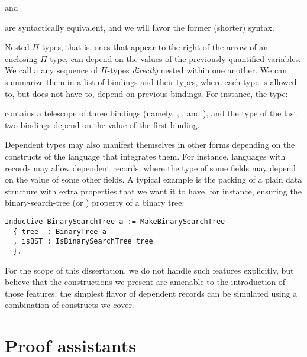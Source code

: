 \noindent
and

\noindent
{}

\noindent
are syntactically equivalent, and we will favor the former (shorter) syntax.


Nested $\Pi$-types, that is, ones that appear to the right of the arrow of an
enclosing $\Pi$-type, can depend on the values of the previously quantified
variables.  We call a  any sequence of $\Pi$-types
\emph{directly} nested within one another.  We can summarize them in a list of
bindings and their types, where each type is allowed to, but does not have to,
depend on previous bindings.  For instance, the type:

\noindent
{}

\noindent
contains a telescope of three bindings (namely, , ,
and ), and the type of the last two bindings depend on the value of
the first binding.

Dependent types may also manifest themselves in other forms depending on the
constructs of the language that integrates them.  For instance, languages with
records may allow dependent records, where the type of some fields may depend on
the value of some other fields.  A typical example is the packing of a plain
data structure with extra properties that we want it to have, for instance,
ensuring the binary-search-tree (or ) property of a binary tree:

\begin{verbatim}
Inductive BinarySearchTree a := MakeBinarySearchTree
  { tree  : BinaryTree a
  , isBST : IsBinarySearchTree tree
  }.
\end{verbatim}

For the scope of this dissertation, we do not handle such features explicitly,
but believe that the constructions we present are amenable to the introduction
of those features: the simplest flavor of dependent records can be simulated
using a combination of constructs we cover.

\section{Proof assistants}

